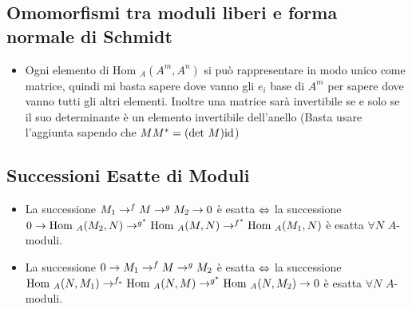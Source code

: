 \documentclass[a4paper,NoNotes,GeneralMath]{stdmdoc}
\newcommand{\Hom}{\text{Hom }}
\begin{document}
	\subsection*{Omomorfismi tra moduli liberi e forma normale di Schmidt}
	\begin{itemize}
		\item Ogni elemento di $\Hom_A(A^m, A^n)$ si può rappresentare in modo unico come matrice, quindi mi basta sapere dove vanno gli $e_i$ base di $A^m$ per sapere dove vanno tutti gli altri elementi. Inoltre una matrice sarà invertibile se e solo se il suo determinante è un elemento invertibile dell'anello (Basta usare l'aggiunta sapendo che $M M^* = (\mbox{det } M) \mbox{id}$)
	\end{itemize}
	
	\subsection*{Successioni Esatte di Moduli}
	\begin{itemize}
		\item La successione $M_1 \rightarrow^f M \rightarrow^g M_2 \rightarrow 0$ è esatta $\Leftrightarrow$ la successione $0 \rar \Hom_A(M_2, N) \rar^{g^*} \Hom_A(M, N) \rar^{f^*} \Hom_A(M_1, N)$ è esatta $\forall N$ $A$-moduli.
		\item La successione $0 \rightarrow M_1 \rightarrow^f M \rightarrow^g M_2$ è esatta $\Leftrightarrow$ la successione $\Hom_A(N, M_1) \rar^{f_*} \Hom_A(N, M) \rar^{g^*} \Hom_A(N, M_2) \rar 0$ è esatta $\forall N$ $A$-moduli.
	\end{itemize}
\end{document}

